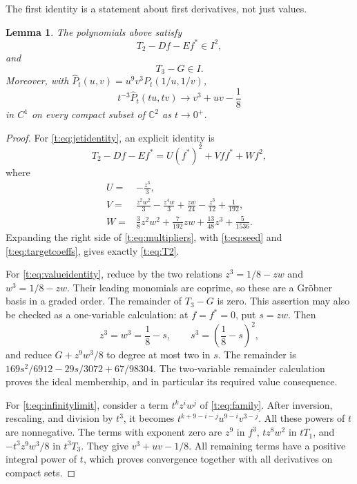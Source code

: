 \documentclass[UTF8,11pt]{ctexart}
\newtheorem{lem}[thm]{Lemma}
\theoremstyle{definition}
\numberwithin{equation}{section}
\newcommand{\C}{\mathbb C}\newcommand{\R}{\mathbb R}
\begin{document}
The first identity is a statement about first derivatives, not just
values.
\begin{lem}\label{t:lem:identities}
The polynomials above satisfy
\begin{equation}\label{t:eq:jetidentity}
 T_2-Df-Ef^*\in I^2,
\end{equation}
and
\begin{equation}\label{t:eq:valueidentity}
 T_3-G\in I.
\end{equation}
Moreover, with
$\widehat P_t(u,v)=u^9v^3P_t(1/u,1/v)$,
\begin{equation}\label{t:eq:infinitylimit}
 t^{-3}\widehat P_t(tu,tv)
 \longrightarrow v^3+uv-\frac18
\end{equation}
in $C^1$ on every compact subset of $\C^2$ as $t\to0^+$.
\end{lem}
\begin{proof}
For \eqref{t:eq:jetidentity}, an explicit identity is
\begin{equation}\label{t:eq:multipliers}
 T_2-Df-Ef^*=U(f^*)^2+Vff^*+Wf^2,
\end{equation}
where
\[
\begin{split}
 U={}&-\frac{z^3}{3},\\
 V={}&\frac{z^2w^2}{3}-\frac{z^4w}{3}+\frac{zw}{24}
       -\frac{z^3}{12}+\frac1{192},\\
 W={}&\frac38z^2w^2+\frac7{192}zw+\frac{13}{48}z^3
       +\frac5{1536}.
\end{split}
\]
Expanding the right side of \eqref{t:eq:multipliers}, with
\eqref{t:eq:seed} and \eqref{t:eq:targetcoeffs}, gives exactly
\eqref{t:eq:T2}.

For \eqref{t:eq:valueidentity}, reduce by the two relations
$z^3=1/8-zw$ and $w^3=1/8-zw$. Their leading monomials are coprime,
so these are a Gr\"obner basis in a graded order. The remainder of
$T_3-G$ is zero. This assertion may also be checked as a one-variable
calculation: at $f=f^*=0$, put $s=zw$. Then
\[
 z^3=w^3=\frac18-s,\qquad
 s^3=\left(\frac18-s\right)^2,
\]
and reduce $G+z^9w^3/8$ to degree at most two in $s$. The remainder is
$169s^2/6912-29s/3072+67/98304$. The two-variable remainder calculation
proves the ideal membership, and in particular its required value
consequence.

For \eqref{t:eq:infinitylimit}, consider a term $t^kz^iw^j$ of
\eqref{t:eq:family}. After inversion, rescaling, and division by $t^3$,
it becomes $t^{k+9-i-j}u^{9-i}v^{3-j}$. All these powers of $t$ are
nonnegative. The terms with exponent zero are $z^9$ in $f^3$,
$tz^8w^2$ in $tT_1$, and $-t^3z^9w^3/8$ in $t^3T_3$.
They give $v^3+uv-1/8$. All remaining terms have a positive integral
power of $t$, which proves convergence together with all derivatives
on compact sets.
\end{proof}
\end{document}
